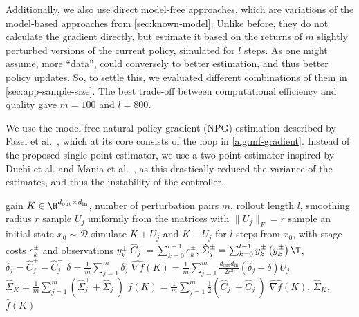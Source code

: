 Additionally, we also use direct model-free approaches, which are variations of the model-based approaches
from \cref{sec:known-model}. Unlike before, they do not calculate the gradient directly, but estimate
it based on the returns of $m$ slightly perturbed versions of the current policy, simulated for $l$ steps. As one might
assume, more ``data'', could conversely to better estimation, and thus better policy updates. So, to
settle this, we evaluated different combinations of them in \cref{sec:app-sample-size}. The best
trade-off between computational efficiency and quality gave $m = 100$ and $l = 800$.

We use the model-free natural policy gradient (NPG) estimation described by Fazel et al.~\cite{Fazel2018Global},
which at its core consists of the loop in \cref{alg:mf-gradient}. Instead of the proposed single-point estimator,
we use a two-point estimator inspired by Duchi et al. and Mania et al.~\cite{Duchi2015Optimal,Mania2018Simple},
as this drastically reduced the variance of the estimates, and thus the instability of the controller.

\begin{algorithm}[htbp]
    \caption{Two-point gradient estimation}
    \label{alg:mf-gradient}
    \begin{algorithmic}[1]
        \REQUIRE gain $K \in \R^{d_{\mathrm{out}} \times d_{\mathrm{in}}}$, number of perturbation pairs $m$,
        rollout length $l$, smoothing radius $r$
            \STATE sample $U_j$ uniformly from the matrices with $\lVert U_j \rVert_F = r$
            \STATE sample an initial state $x_0 \sim \mathcal{D}$
            \STATE simulate $K + U_j$ and $K - U_j$ for $l$ steps from $x_0$, with stage costs $c_k^{\pm}$ and
            observations $y_k^{\pm}$
            \STATE $\hat{C}_j^{\pm} = \sum_{k=0}^{l-1} c_k^{\pm}$, \quad
            $\hat{\Sigma}_j^{\pm} = \sum_{k=0}^{l-1} y_k^{\pm} \left( y_k^{\pm} \right)\T$, \quad
            $\delta_j = \hat{C}_j^{+} - \hat{C}_j^{-}$
        \ENDFOR
        \STATE $\bar{\delta} = \frac{1}{m} \sum_{j=1}^{m} \delta_j$
        \STATE $\widehat{\nabla f}(K) = \frac{1}{m} \sum_{j=1}^{m}
        \frac{d_{\mathrm{out}} d_{\mathrm{in}}}{2 r^2} \left( \delta_j - \bar{\delta} \right) U_j$
        \STATE $\hat{\Sigma}_K = \frac{1}{m} \sum_{j=1}^{m} \left( \hat{\Sigma}_j^{+} + \hat{\Sigma}_j^{-} \right)$
        \STATE $\hat{f}(K) = \frac{1}{m} \sum_{j=1}^{m} \frac{1}{2} \left( \hat{C}_j^{+} + \hat{C}_j^{-} \right)$
        \RETURN $\widehat{\nabla f}(K)$, $\hat{\Sigma}_K$, $\hat{f}(K)$
    \end{algorithmic}
\end{algorithm}


